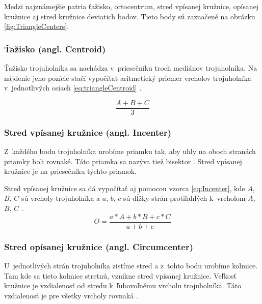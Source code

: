  Medzi najznámejšie patria ťažisko, ortocentrum, stred vpísanej kružnice, opísanej kružnice  aj stred kružnice deviatich bodov. Tieto body sú zaznačené na obrázku \ref{fig:TriangleCenters}.

\subsubsection{Ťažisko (angl. Centroid)}
Ťažisko trojuholníka sa nachádza v~priesečníku troch mediánov trojuholníka. Na nájdenie jeho pozície stačí vypočítať aritmetický priemer vrcholov trojuholníka v~jednotlivých osiach \ref{eq:triangleCentroid} \cite{bose2015mathemaics}.



\begin{equation}
    \frac{A+B+C}{3}
    \label{eq:triangleCentroid}
\end{equation}

\subsubsection{Stred vpísanej kružnice (angl. Incenter)}
\label{sec:TriangleCenter}

Z~každého bodu trojuholníka urobíme priamku tak, aby uhly na oboch stranách priam\-ky boli rovnaké. Táto priamka sa nazýva tiež bisektor \cite{bose2015mathemaics}. Stred vpísanej kružnice je na priesečníku týchto priamok.




Stred vpísanej kružnice sa dá vypočítať aj pomocou vzorca \ref{eq:Incenter}, kde  $A$, $B$, $C$ sú vrcholy trojuholníka a $a$, $b$, $c$ sú dĺžky strán protiľahlých k~vrcholom $A$, $B$, $C$ \cite{Incenter_page_2011}.
\begin{equation}
O = \frac{a\ast A+b\ast  B +c \ast C}{a + b + c}
    \label{eq:Incenter}
\end{equation}


\subsubsection{Stred opísanej kružnice (angl. Circumcenter)}

U~jednotlivých strán trojuholníka zistíme stred a z~tohto bodu urobíme kolmice. Tam kde sa tieto kolmice stretnú, vznikne stred vpísanej kružnice. Veľkosť kružnice je vzdialenosť od stredu k~ľubovoľnému vrcholu trojuholníka. Táto vzdialenosť je pre všetky vrcholy rovnaká \cite{kelley2013humongous}.


